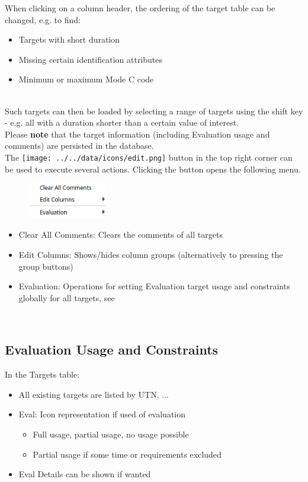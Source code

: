 When clicking on a column header, the ordering of the target table can be changed, e.g. to find:

\begin{itemize}  
\item Targets with short duration
\item Missing certain identification attributes
\item Minimum or maximum Mode C code
\end{itemize}
\ \\

Such targets can then be loaded by selecting a range of targets using the shift key - e.g. all with a duration shorter than a certain value of interest. \\

Please \textbf{note} that the target information (including Evaluation usage and comments) are persisted in the database. \\

The \texttt{[image: ../../data/icons/edit.png]} button in the top right corner can be used to execute several actions.
Clicking the button opens the following menu.

\begin{figure}[H]
    \center
    \includegraphics[width=3.5cm,frame]{figures/ui_targets_config.png}
\end{figure}

\begin{itemize}
  \item Clear All Comments: Clears the comments of all targets
  \item Edit Columns: Shows/hides column groups (alternatively to pressing the group buttons)
  \item Evaluation: Operations for setting Evaluation target usage and constraints globally for all targets, see 
 \end{itemize} 
 \  \\

\subsection{Evaluation Usage and Constraints}
\label{sec:ui_eval_usage}

In the Targets table:
\begin{itemize}
  \item All existing targets are listed by UTN, ...
  \item Eval: Icon representation if used of evaluation
  \begin{itemize}
  \item Full usage, partial usage, no usage possible
  \item Partial usage if some time or requirements excluded
 \end{itemize}
 \item Eval Details can be shown if wanted
 \end{itemize}
 \  \\

